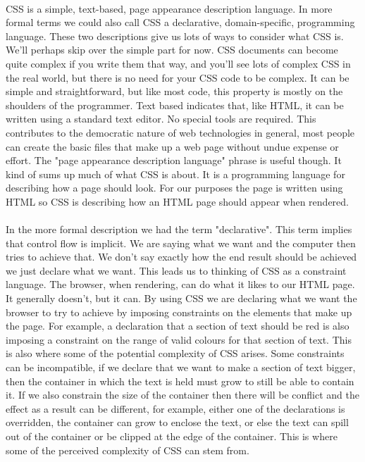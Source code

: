 \paragraph{} CSS is a simple, text-based, page appearance description language. In more formal terms we could also call CSS a declarative, domain-specific, programming language. These two descriptions give us lots of ways to consider what CSS is. We'll perhaps skip over the simple part for now. CSS documents can become quite complex if you write them that way, and you'll see lots of complex CSS in the real world, but there is no need for your CSS code to be complex. It can be simple and straightforward, but like most code, this property is mostly on the shoulders of the programmer. Text based indicates that, like HTML, it can be written using a standard text editor. No special tools are required. This contributes to the democratic nature of web technologies in general, most people can create the basic files that make up a web page without undue expense or effort. The "page appearance description language" phrase is useful though. It kind of sums up much of what CSS is about. It is a programming language for describing how a page should look. For our purposes the page is written using HTML so CSS is describing how an HTML page should appear when rendered.
\paragraph{} In the more formal description we had the term "declarative". This term implies that control flow is implicit. We are saying what we want and the computer then tries to achieve that. We don't say exactly how the end result should be achieved we just declare what we want. This leads us to thinking of CSS as a constraint language. The browser, when rendering, can do what it likes to our HTML page. It generally doesn't, but it can. By using CSS we are declaring what we want the browser to try to achieve by imposing constraints on the elements that make up the page. For example, a declaration that a section of text should be red is also imposing a constraint on the range of valid colours for that section of text. This is also where some of the potential complexity of CSS arises. Some constraints can be incompatible, if we declare that we want to make a section of text bigger, then the container in which the text is held must grow to still be able to contain it. If we also constrain the size of the container then there will be conflict and the effect as a result can be different, for example, either one of the declarations is overridden, the container can grow to enclose the text, or else the text can spill out of the container or be clipped at the edge of the container. This is where some of the perceived complexity of CSS can stem from.
